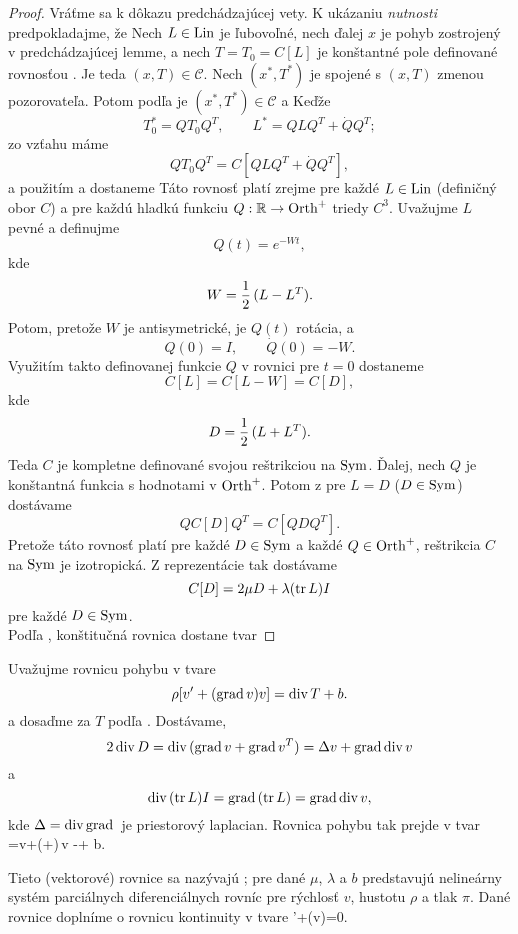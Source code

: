 \begin{proof}
Vráťme sa k dôkazu predchádzajúcej vety. K ukázaniu 
{\it nutnosti}  predpokladajme, že
Nech $L \in \mbox{Lin}$ je ľubovoľné, nech ďalej $x$ je pohyb zostrojený v
predchádzajúcej lemme, a nech $T=T_0=C[L]$ je konštantné pole definované
rovnosťou . Je teda $(x,T)\in \mathcal C$. 
Nech $(x^*,T^*)$ je spojené s $(x,T)$ zmenou pozorovateľa. 
Potom podľa  je $(x^*,T^*)\in \mathcal C$ a
Keďže
$$T^*_0=QT_0Q^T,\qquad L^*=QLQ^T+\dot QQ^T;$$
zo vzťahu  máme
$$QT_0Q^T=C[QLQ^T+\dot QQ^T],$$
a použitím  a  dostaneme
Táto rovnosť platí zrejme pre každé $L\in\mbox{Lin}$ (definičný obor $C$) a pre každú
hladkú funkciu $Q:\mathbb R \rightarrow \mbox{Orth}^+$ triedy $C^3$. Uvažujme $L$ pevné a
definujme $$Q(t)=e^{-Wt},$$ kde $$W=\frac{1}{2}\,(L-L^T).$$
Potom, pretože $W$ je antisymetrické, je $Q(t)$ rotácia, a $$Q(0)=I,\qquad \dot
Q(0)=-W.$$ Využitím takto definovanej funkcie $Q$ v rovnici  pre 
$t=0$ dostaneme $$C[L]=C[L-W]=C[D],$$ kde $$D=\frac{1}{2}\,(L+L^T).$$
Teda $C$ je kompletne definované svojou reštrikciou na $\mbox{Sym}$.
Ďalej, nech $Q$ je konštantná funkcia s hodnotami v $\mbox{Orth}^+$. Potom
z  pre $L=D$ ($D\in\mbox{Sym}$) dostávame $$QC[D]Q^T=C[QDQ^T].$$
Pretože táto rovnosť platí pre každé $D\in\mbox{Sym}$ a každé $Q\in\mbox{Orth}^+$, 
reštrikcia $C$ na $\mbox{Sym}$ je izotropická. Z reprezentácie  tak dostávame
$$C[D]=2\mu D + \lambda (\mbox{tr}\,L)I$$ pre každé $D\in\mbox{Sym}$. \\
Podľa , konštitučná rovnica  dostane tvar
\end{proof}


Uvažujme rovnicu pohybu v tvare
$$\rho[v'+(\mbox{grad}\,v)v]=\mbox{div}\,T+b.$$
a dosaďme za $T$ podľa .
Dostávame,
$$2\,\mbox{div}\,D=\mbox{div}\,(\mbox{grad}\,v+\mbox{grad}\,v^T)=\Delta v+\mbox{grad}\,\mbox{div}\,v$$
a
$$\mbox{div}\,(\mbox{tr}\,L)I=\mbox{grad}\,(\mbox{tr}\,L)=\mbox{grad}\,\mbox{div}\,v,$$
kde $\Delta=\dv \grad$ je priestorový laplacian. Rovnica pohybu tak prejde v tvar
{
\rho[v'+(\grad v)v]=\mu\Delta v+(\lambda+\mu)\,\grad \dv v -\grad \pi + b.
}

Tieto (vektorové) rovnice sa nazývajú ; pre dané $\mu$,
$\lambda$ a $b$ 
predstavujú nelineárny systém parciálnych diferenciálnych rovníc pre rýchlosť
$v$, hustotu $\rho$ a tlak $\pi$.
Dané rovnice doplníme o rovnicu kontinuity v tvare
{
\rho'+\dv(\rho v)=0.
}

